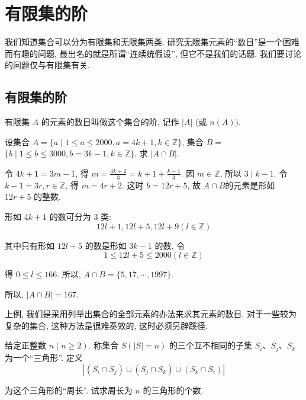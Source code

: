 \section{有限集的阶}
我们知道集合可以分为有限集和无限集两类. 研究无限集元素的“数目”是一个困难而有趣的问题, 最出名的就是所谓“连续统假设”, 但它不是我们的话题. 我们要讨论的问题仅与有限集有关.
\subsection{有限集的阶}
有限集 $A$ 的元素的数目叫做这个集合的阶, 记作 $|A|$ (或 $n(A))$.
\begin{example}
	设集合 $A=\{a \mid 1 \leqslant a \leqslant 2000, a=4 k+1, k \in \mathbb{Z}\}$, 集合 $B=$ $\{b \mid 1 \leqslant b \leqslant 3000, b=3 k-1, k \in \mathbb{Z}\}$. 求 $|A \cap B|$.
\end{example}

\begin{analysis}
	令 $4 k+1=3 m-1$, 得 $m=\frac{4 k+2}{3}=k+1+\frac{k-1}{3}$. 因 $m \in \mathbb{Z}$, 所以 $3 \mid k-1$. 令 $k-1=3 r, r \in \mathbb{Z}$, 得 $m=4 r+2$. 这时 $b=12 r+5$, 故 $A \cap B$的元素是形如 $12 r+5$ 的整数.
\end{analysis}

\begin{solution}
	形如 $4 k+1$ 的数可分为 3 类:
	$$
		12 l+1,12 l+5,12 l+9(l \in \mathbb{Z})
	$$

	其中只有形如 $12 l+5$ 的数是形如 $3 k-1$ 的数. 令
	$$
		1 \leqslant 12 l+5 \leqslant 2000(l \in \mathbb{Z})
	$$

	得 $0 \leqslant l \leqslant 166$. 所以, $A \cap B=\{5,17, \cdots, 1997\}$.

	所以, $|A \cap B|=167$.
\end{solution}

\begin{note}
	上例, 我们是采用列举出集合的全部元素的办法来求其元素的数目. 对于一些较为复杂的集合, 这种方法是很难奏效的, 这时必须另辟蹊径.
\end{note}

\begin{example}
	给定正整数 $n(n \geqslant 2)$. 称集合 $S(|S|=n)$ 的三个互不相同的子集 $S_{i} 、 S_{j} 、 S_{k}$ 为一个“三角形”. 定义
	$$
		\left|\left(S_{i} \cap S_{j}\right) \cup\left(S_{j} \cap S_{k}\right) \cup\left(S_{k} \cap S_{i}\right)\right|
	$$

	为这个三角形的“周长”. 试求周长为 $n$ 的三角形的个数.
\end{example}

